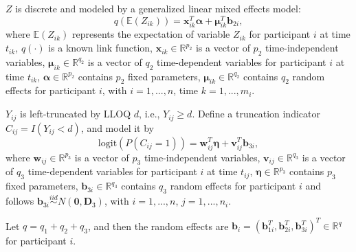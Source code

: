 
$Z$ is discrete and modeled by a generalized linear mixed effects model:
\begin{equation}
    q(\mathbb{E}(Z_{ik})) = \boldsymbol{x}_{ik}^T \boldsymbol{\alpha} + \boldsymbol{\mu}_{ik}^T \boldsymbol{b}_{2i},
\end{equation}
where $\mathbb{E}(Z_{ik})$ represents the expectation of variable $Z_{ik}$ for participant $i$ at time $t_{ik}$, $q(\cdot)$ is a known link function, $\boldsymbol{x}_{ik}\in \mathbb{R}^{p_2}$ is a vector of $p_2$ time-independent variables, $ \boldsymbol{\mu}_{ik}\in \mathbb{R}^{q_2}$ is a vector of $q_2$ time-dependent variables for participant $i$ at time $t_{ik}$, $\boldsymbol{\alpha}\in \mathbb{R}^{p_2}$ contains $p_2$ fixed parameters, $\boldsymbol{\mu}_{ik}\in \mathbb{R}^{q_2}$ contains $q_2$ random effects for participant $i$, with $i=1,...,n$, time $k=1,...,m_i$.


$Y_{ij}$ is left-truncated by LLOQ $d$, i.e., $Y_{ij}\geq d$. Define a truncation indicator %
$C_{ij} = I(Y_{ij}<d)$, and model it by
\begin{equation}
    \text{logit}(P(C_{ij} = 1)) = \boldsymbol{w}_{ij}^T \boldsymbol{\eta} + \boldsymbol{v}_{ij}^T \boldsymbol{b}_{3i},
\end{equation}
where $\boldsymbol{w}_{ij}\in \mathbb{R}^{p_3}$ is a vector of $p_3$ time-independent variables, $\boldsymbol{v}_{ij}\in \mathbb{R}^{q_3}$ is a vector of $q_3$ time-dependent variables for participant $i$ at time $t_{ij}$, $\boldsymbol{\eta}\in \mathbb{R}^{p_3}$ contains $p_3$ fixed parameters, $\boldsymbol{b}_{3i}\in \mathbb{R}^{q_3}$ contains $q_3$ random effects for participant $i$ and follows $\boldsymbol{b}_{3i}\stackrel{iid}{\sim} N(\boldsymbol{0}, \boldsymbol{D}_3)$, with $i=1,...,n$, $j=1,...,n_i$. 


Let $q=q_1+q_2+q_3$, and then the random effects are $\boldsymbol{b}_i = (\boldsymbol{b}_{1i}^T, \boldsymbol{b}_{2i}^T, \boldsymbol{b}_{3i}^T)^T \in \mathbb{R}^{q}$ for participant $i$.



